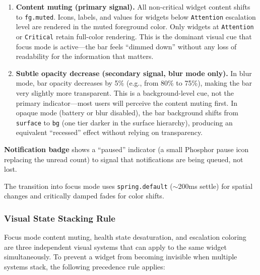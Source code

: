 \documentclass[11pt,a4paper]{article}
\begin{document}
\begin{enumerate}[leftmargin=1.5em, itemsep=3pt]
  \item \textbf{Content muting (primary signal).} All non-critical widget content shifts to \texttt{fg.muted}. Icons, labels, and values for widgets below \texttt{Attention} escalation level are rendered in the muted foreground color. Only widgets at \texttt{Attention} or \texttt{Critical} retain full-color rendering. This is the dominant visual cue that focus mode is active---the bar feels ``dimmed down'' without any loss of readability for the information that matters.

  \item \textbf{Subtle opacity decrease (secondary signal, blur mode only).} In blur mode, bar opacity decreases by 5\% (e.g., from 80\% to 75\%), making the bar very slightly more transparent. This is a background-level cue, not the primary indicator---most users will perceive the content muting first. In opaque mode (battery or blur disabled), the bar background shifts from \texttt{surface} to \texttt{bg} (one tier darker in the surface hierarchy), producing an equivalent ``recessed'' effect without relying on transparency.
\end{enumerate}

\textbf{Notification badge} shows a ``paused'' indicator (a small Phosphor pause icon replacing the unread count) to signal that notifications are being queued, not lost.

The transition into focus mode uses \texttt{spring.default} ($\sim$200ms settle) for spatial changes and critically damped fades for color shifts.

\subsubsection{Visual State Stacking Rule}

Focus mode content muting, health state desaturation, and escalation coloring are three independent visual systems that can apply to the same widget simultaneously. To prevent a widget from becoming invisible when multiple systems stack, the following precedence rule applies:
\end{document}
